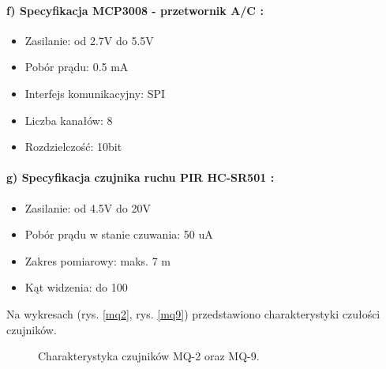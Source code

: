 \paragraph{f) Specyfikacja MCP3008 - przetwornik A/C \protect\cite{specyfikacjaAC}:}
\begin{itemize} 
\item Zasilanie: od 2.7V do 5.5V
\item Pobór prądu: 0.5 mA
\item Interfejs komunikacyjny: SPI
\item Liczba kanałów: 8
\item Rozdzielczość: 10bit
\end{itemize}
\paragraph{g) Specyfikacja czujnika ruchu PIR HC-SR501 \protect\cite{pir}:}
\begin{itemize} 
\item Zasilanie: od 4.5V do 20V
\item Pobór prądu w stanie czuwania: 50 uA
\item Zakres pomiarowy: maks. 7 m
\item Kąt widzenia: do 100\textdegree{}
\end{itemize}
Na wykresach (rys. \ref{mq2}, rys. \ref{mq9}) przedstawiono charakterystyki czułości czujników.
\begin{figure}[ht]
	\centering
	\hfill
	\caption{Charakterystyka czujników MQ-2 oraz MQ-9.}
	\label{mq2_mq9}
\end{figure}
